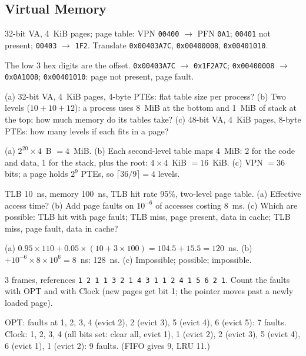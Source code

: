 \subsection{Virtual Memory}

\begin{exercise}
32-bit VA, 4~KiB pages; page table: VPN \texttt{00400} $\to$ PFN \texttt{0A1};
\texttt{00401} not present; \texttt{00403} $\to$ \texttt{1F2}. Translate
\texttt{0x00403A7C}, \texttt{0x00400008}, \texttt{0x00401010}.
\end{exercise}
\begin{solution}
The low 3 hex digits are the offset. \texttt{0x00403A7C} $\to$ \texttt{0x1F2A7C};
\texttt{0x00400008} $\to$ \texttt{0x0A1008}; \texttt{0x00401010}: page not present,
page fault.
\end{solution}

\begin{exercise}
(a) 32-bit VA, 4~KiB pages, 4-byte PTEs: flat table size per process? (b) Two levels
($10+10+12$): a process uses 8~MiB at the bottom and 1~MiB of stack at the top; how
much memory do its tables take? (c) 48-bit VA, 4~KiB pages, 8-byte PTEs: how many
levels if each fits in a page?
\end{exercise}
\begin{solution}
(a) $2^{20}\times4$~B $=4$~MiB. (b) Each second-level table maps 4~MiB: 2 for the code
and data, 1 for the stack, plus the root: $4\times4$~KiB $=16$~KiB. (c) VPN $=36$ bits;
a page holds $2^9$ PTEs, so $\lceil36/9\rceil=4$ levels.
\end{solution}

\begin{exercise}
TLB 10~ns, memory 100~ns, TLB hit rate 95\%, two-level page table. (a) Effective
access time? (b) Add page faults on $10^{-6}$ of accesses costing 8~ms. (c) Which are
possible: TLB hit with page fault; TLB miss, page present, data in cache; TLB miss,
page fault, data in cache?
\end{exercise}
\begin{solution}
(a) $0.95\times110+0.05\times(10+3\times100)=104.5+15.5=120$~ns. (b)
$+10^{-6}\times8\times10^6=8$~ns: 128~ns. (c) Impossible; possible; impossible.
\end{solution}

\begin{exercise}
3 frames, references \texttt{1 2 1 1 3 2 1 4 3 1 1 2 4 1 5 6 2 1}. Count the faults
with OPT and with Clock (new pages get bit 1; the pointer moves past a newly loaded
page).
\end{exercise}
\begin{solution}
OPT: faults at 1, 2, 3, 4 (evict 2), 2 (evict 3), 5 (evict 4), 6 (evict 5): 7 faults.
Clock: 1, 2, 3, 4 (all bits set: clear all, evict 1), 1 (evict 2), 2 (evict 3), 5
(evict 4), 6 (evict 1), 1 (evict 2): 9 faults. (FIFO gives 9, LRU 11.)
\end{solution}

